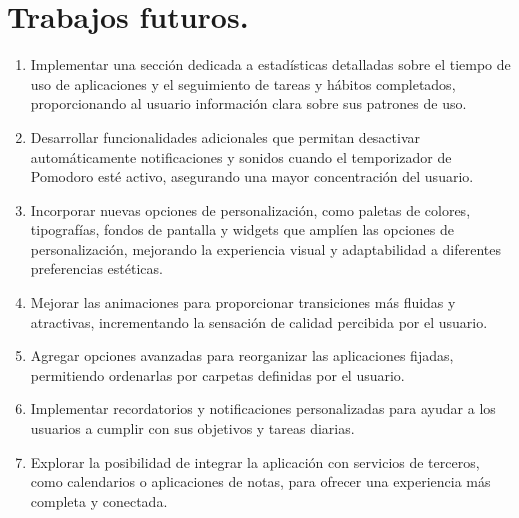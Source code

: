 \pagebreak

\section{Trabajos futuros.}
\label{sec:trabajos_futuros}

\begin{enumerate}
    \item Implementar una sección dedicada a estadísticas detalladas sobre el tiempo de uso de aplicaciones y el seguimiento de tareas y hábitos completados, proporcionando al usuario información clara sobre sus patrones de uso.
    \item Desarrollar funcionalidades adicionales que permitan desactivar automáticamente notificaciones y sonidos cuando el temporizador de Pomodoro esté activo, asegurando una mayor concentración del usuario.
    \item Incorporar nuevas opciones de personalización, como paletas de colores, tipografías, fondos de pantalla y widgets que amplíen las opciones de personalización, mejorando la experiencia visual y adaptabilidad a diferentes preferencias estéticas.
    \item Mejorar las animaciones para proporcionar transiciones más fluidas y atractivas, incrementando la sensación de calidad percibida por el usuario.
    \item Agregar opciones avanzadas para reorganizar las aplicaciones fijadas, permitiendo ordenarlas por carpetas definidas por el usuario.
    \item Implementar recordatorios y notificaciones personalizadas para ayudar a los usuarios a cumplir con sus objetivos y tareas diarias.
    \item Explorar la posibilidad de integrar la aplicación con servicios de terceros, como calendarios o aplicaciones de notas, para ofrecer una experiencia más completa y conectada.
\end{enumerate}
